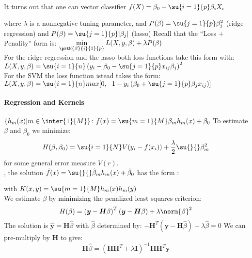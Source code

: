It turns out that one can 
vector classifier $f(X)=\beta_{0}+\su{{i=1}}{p}\beta_{i}X_{i}$
\begin{center}
\end{center}
where $\lambda$ is a nonnegative tuning parameter, and 
$P(\beta)=\su{{j=1}}{p}\beta_{j}^{2}$ (ridge regression) and 
$P(\beta)=\su{{j=1}}{p}|\beta_{j}|$ (lasso)
Recall that the ``Loss + Penality'' form is:
$\min\limits_{\prtH{\beta}{i}{1}{p}}{L(X,y,\beta)+\lambda P(\beta)}$\\
For the ridge regression and the lasso both loss functions take this
form with:\\
$L(X,y,\beta)=\su{{i=1}}{n}\left( y_{i}-\beta_{0}-\su{{j=1}}{p}x_{ij}\beta_{j} \right)^{2}$\\
For the SVM the loss function istead takes the form:\\
$L(X,y,\beta)=\su{{i=1}}{n}max[0,~~1-y_{i}\left( \beta_{0}+\su{{j=1}}{p}\beta_{j}x_{ij} \right)]$

\paragraph{Regression and Kernels}
 $\left\{h_{m}(x)|m\in\inter{1}{M}\right\}$: $f(x)=\su{{m=1}}{M}\beta_{m}h_{m}(x)+
\beta_{0}$ To estimate $\beta$ and $\beta_{0}$ we minimize:
$$ H(\beta,\beta_{0})=\su{{i=1}}{N}V(y_{i}-f(x_{i}))+\dfrac{\lambda}{2}\su{}{}\beta_{m}^{2}$$
for some general error measure $V(r)$.\\
, the solution $\hat{f}(x)=
\su{}{}\hat{\beta}_{m}h_{m}(x)+\hat{\beta}_{0}$ has the form : 
\begin{center}
\end{center}
with $K(x,y)=\su{{m=1}}{M}h_{m}(x)h_{m}(
y)$\\
We estimate $\beta$ by minimizing the penalized least squares criterion:
$$ H(\beta)=\left(\bm{y}-\bm{H}\beta\right)^{T}\left(\bm{y}-\bm{H}\beta\right) + 
\lambda\norm{\beta}^{2}$$
The solution is $\hat{\bm{y}} = \bm{H}\hat{\beta}$ with $\hat{\beta}$ determined by:
$-\bm{H}^{T}(\bm{y}-\bm{H}\hat{\beta}) + \lambda\hat{\beta} = 0$
We can pre-multiply by $\bm{H}$ to give: 
$$ \bm{H}\hat{\beta} = \left(\bm{H}\bm{H}^{T}+\lambda\bm{I}\right)^{-1}\bm{H}\bm{H}^{T}\bm{y}$$


